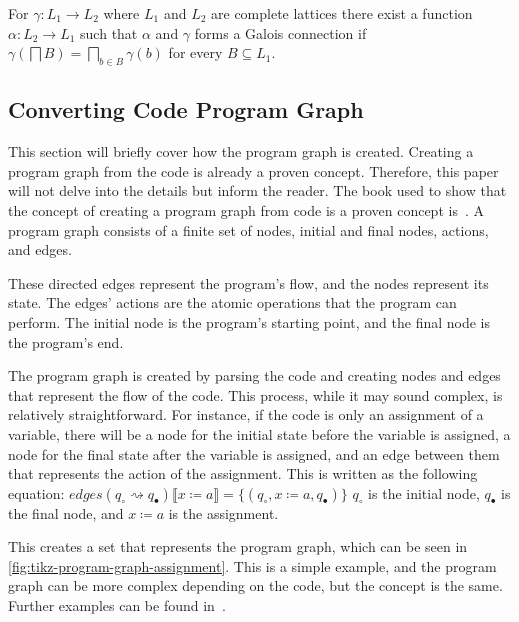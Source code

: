 \begin{theorem}\label{thm:galoispre}
    For $\gamma : L_1 \rightarrow L_2$ where $L_1$ and $L_2$ are complete lattices there exist a function $\alpha : L_2 \rightarrow L_1$ such that $\alpha$ and $\gamma$ forms a Galois connection if $\gamma\left(\bigsqcap B\right) = \bigsqcap_{b \in B}\gamma(b)$ for every $B \subseteq L_1$.
\end{theorem}

\subsection{Converting Code Program Graph}\label{subsec:converting-code-program-graph}
This section will briefly cover how the program graph is created.
Creating a program graph from the code is already a proven concept.
Therefore, this paper will not delve into the details but inform the reader.
The book used to show that the concept of creating a program graph from code is a proven concept is~\cite[see][chap 2.2]{nielson_formal_2019}.
A program graph consists of a finite set of nodes, initial and final nodes, actions, and edges.

These directed edges represent the program's flow, and the nodes represent its state.
The edges' actions are the atomic operations that the program can perform.
The initial node is the program's starting point, and the final node is the program's end.

The program graph is created by parsing the code and creating nodes and edges that represent the flow of the code.
This process, while it may sound complex, is relatively straightforward.
For instance, if the code is only an assignment of a variable, there will be a node for the initial state before the variable is assigned, a node for the final state after the variable is assigned, and an edge between them that represents the action of the assignment.
This is written as the following equation:
$edges(q_{\circ} \rightsquigarrow q_{\bullet})\llbracket x \coloneqq a \rrbracket = \{(q_{\circ}, x \coloneqq a, q_{\bullet})\}$
$q_{\circ}$ is the initial node, $q_{\bullet}$ is the final node, and $x \coloneqq a$ is the assignment.

This creates a set that represents the program graph, which can be seen in \autoref{fig:tikz-program-graph-assignment}.
This is a simple example, and the program graph can be more complex depending on the code, but the concept is the same.
Further examples can be found in~\cite[Figure 2.6]{nielson_formal_2019}.

